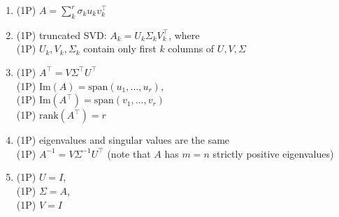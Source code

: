 {\color{solution}
\begin{enumerate}
	\item \textcolor{exampoints}{(1P)} $A =\sum_k^r \sigma_k u_kv_k^\top$
	\item \textcolor{exampoints}{(1P)} truncated SVD: $A_k = U_k \Sigma_k V_k^\top$, where\\
	\textcolor{exampoints}{(1P)} $U_k, V_k,\Sigma_k$ contain only first $k$ columns of $U, V,\Sigma$
	\item \textcolor{exampoints}{(1P)} $A^\top = V\Sigma^\top U ^\top$\\
	\textcolor{exampoints}{(1P)} $\text{Im}(A)= \text{span}(u_1,\ldots, u_r)$,\\
	\textcolor{exampoints}{(1P)} $\text{Im}(A^\top)= \text{span}(v_1,\ldots, v_r)$\\
	\textcolor{exampoints}{(1P)} $\text{rank}(A^\top) = r$
	\item \textcolor{exampoints}{(1P)} eigenvalues and singular values are the same\\
	\textcolor{exampoints}{(1P)}  $A^{-1} = V \Sigma^{-1}U^\top$ (note that $A$ has $m=n$ strictly positive eigenvalues)
	\item \textcolor{exampoints}{(1P)} $U = I$,\\ \textcolor{exampoints}{(1P)} $\Sigma = A$,\\ \textcolor{exampoints}{(1P)} $V = I$
\end{enumerate}
}
